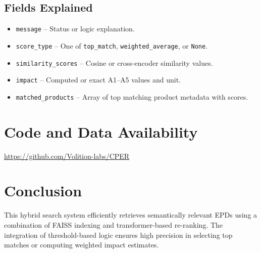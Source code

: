 \documentclass[11pt]{article}
\begin{document}
\subsection*{Fields Explained}
\begin{itemize}
  \item \texttt{message} – Status or logic explanation.
  \item \texttt{score\_type} – One of \texttt{top\_match}, \texttt{weighted\_average}, or \texttt{None}.
  \item \texttt{similarity\_scores} – Cosine or cross-encoder similarity values.
  \item \texttt{impact} – Computed or exact A1–A5 values and unit.
  \item \texttt{matched\_products} – Array of top matching product metadata with scores.
\end{itemize}

\section{Code and Data Availability}

\url{https://github.com/Volition-labs/CPER}


\section{Conclusion}
This hybrid search system efficiently retrieves semantically relevant EPDs using a combination of FAISS indexing and transformer-based re-ranking. The integration of threshold-based logic ensures high precision in selecting top matches or computing weighted impact estimates.
\end{document}
